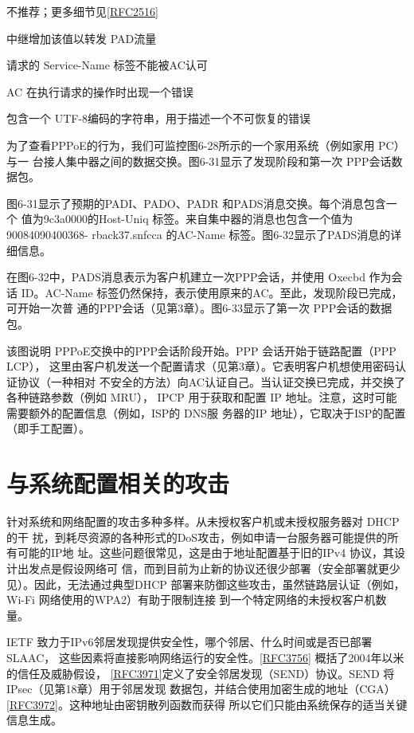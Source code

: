 不推荐；更多细节见\href{https://www.rfc-editor.org/rfc/rfc2516}{\href{https://www.rfc-editor.org/rfc/rfc2516}{[RFC2516]}}

中继增加该值以转发 PAD流量

请求的 Service-Name 标签不能被AC认可

AC 在执行请求的操作时出现一个错误

包含一个 UTF-8编码的字符串，用于描述一个不可恢复的错误

为了查看PPPoE的行为，我们可监控图6-28所示的一个家用系统（例如家用 PC）与一
台接人集中器之间的数据交换。图6-31显示了发现阶段和第一次 PPP会话数据包。

图6-31显示了预期的PADI、PADO、PADR 和PADS消息交换。每个消息包含一个
值为9c3a0000的Host-Uniq 标签。来自集中器的消息也包含一个值为90084090400368-
rback37.snfcca 的AC-Name 标签。图6-32显示了PADS消息的详细信息。

在图6-32中，PADS消息表示为客户机建立一次PPP会话，并使用 Oxecbd 作为会话
ID。AC-Name 标签仍然保持，表示使用原来的AC。至此，发现阶段已完成，可开始一次普
通的PPP会话（见第3章）。图6-33显示了第一次 PPP会话的数据包。

该图说明 PPPoE交换中的PPP会话阶段开始。PPP 会话开始于链路配置（PPP LCP），
这里由客户机发送一个配置请求（见第3章）。它表明客户机想使用密码认证协议（一种相对
不安全的方法）向AC认证自己。当认证交换已完成，并交换了各种链路参数（例如 MRU），
IPCP 用于获取和配置 IP 地址。注意，这时可能需要额外的配置信息（例如，ISP的 DNS服
务器的IP 地址），它取决于ISP的配置（即手工配置）。

\section{与系统配置相关的攻击}

针对系统和网络配置的攻击多种多样。从未授权客户机或未授权服务器对 DHCP 的干
扰，到耗尽资源的各种形式的DoS攻击，例如申请一台服务器可能提供的所有可能的IP地
址。这些问题很常见，这是由于地址配置基于旧的IPv4 协议，其设计出发点是假设网络可
信，而到目前为止新的协议还很少部署（安全部署就更少见）。因此，无法通过典型DHCP
部署来防御这些攻击，虽然链路层认证（例如，Wi-Fi 网络使用的WPA2）有助于限制连接
到一个特定网络的未授权客户机数量。

IETF 致力于IPv6邻居发现提供安全性，哪个邻居、什么时间或是否已部署SLAAC，
这些因素将直接影响网络运行的安全性。\href{https://www.rfc-editor.org/rfc/rfc3756}{\href{https://www.rfc-editor.org/rfc/rfc3756}{[RFC3756]}}
概括了2004年以米的信任及威胁假设，
\href{https://www.rfc-editor.org/rfc/rfc3971}{\href{https://www.rfc-editor.org/rfc/rfc3971}{[RFC3971]}}定义了安全邻居发现（SEND）协议。SEND
将 IPsec（见第18章）用于邻居发现
数据包，并结合使用加密生成的地址（CGA）\href{https://www.rfc-editor.org/rfc/rfc3972}{\href{https://www.rfc-editor.org/rfc/rfc3972}{[RFC3972]}}。这种地址由密钥散列函数而获得
所以它们只能由系统保存的适当关键信息生成。

